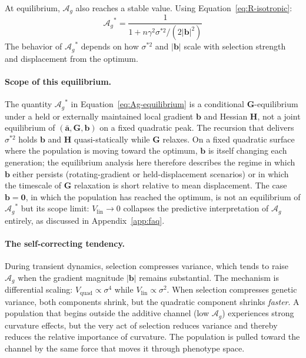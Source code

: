 \documentclass[9pt,twocolumn,twoside,lineno]{gsajnl}
\newcommand{\vect}[1]{\boldsymbol{#1}}
\newcommand{\mat}[1]{\mathbf{#1}}
\newcommand{\Ag}{\ensuremath{\mathcal{A}_{g}}\xspace}
\newcommand{\Vlin}{\ensuremath{V_{\text{lin}}}\xspace}
\newcommand{\Vquad}{\ensuremath{V_{\text{quad}}}\xspace}
\begin{document}
At equilibrium, \Ag also reaches a stable value. Using Equation~\eqref{eq:R-isotropic}:
\begin{equation}
\Ag^* = \frac{1}{1 + n\gamma^2 \sigma^{*2}/(2|\vect{b}|^2)}
\label{eq:Ag-equilibrium}
\end{equation}
The behavior of $\Ag^*$ depends on how $\sigma^{*2}$ and $|\vect{b}|$ scale with selection strength and displacement from the optimum.

\paragraph{Scope of this equilibrium.}
The quantity $\Ag^*$ in Equation~\eqref{eq:Ag-equilibrium} is a conditional $\mat{G}$-equilibrium under a held or externally maintained local gradient $\vect{b}$ and Hessian $\mat{H}$, not a joint equilibrium of $(\bar{\vect{a}},\mat{G},\vect{b})$ on a fixed quadratic peak. The recursion that delivers $\sigma^{*2}$ holds $\vect{b}$ and $\mat{H}$ quasi-statically while $\mat{G}$ relaxes. On a fixed quadratic surface where the population is moving toward the optimum, $\vect{b}$ is itself changing each generation; the equilibrium analysis here therefore describes the regime in which $\vect{b}$ either persists (rotating-gradient or held-displacement scenarios) or in which the timescale of $\mat{G}$ relaxation is short relative to mean displacement. The case $\vect{b} = \vect{0}$, in which the population has reached the optimum, is not an equilibrium of $\Ag^*$ but its scope limit: $\Vlin \to 0$ collapses the predictive interpretation of $\Ag$ entirely, as discussed in Appendix~\ref{app:faq}.

\paragraph{The self-correcting tendency.}
During transient dynamics, selection compresses variance, which tends to raise \Ag when the gradient magnitude $|\vect{b}|$ remains substantial. The mechanism is differential scaling: $\Vquad \propto \sigma^4$ while $\Vlin \propto \sigma^2$. When selection compresses genetic variance, both components shrink, but the quadratic component shrinks \emph{faster}. A population that begins outside the additive channel (low \Ag) experiences strong curvature effects, but the very act of selection reduces variance and thereby reduces the relative importance of curvature. The population is pulled toward the channel by the same force that moves it through phenotype space.
\end{document}
